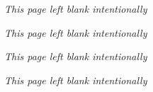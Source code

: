 \documentclass[10pt,twoside]{book}
\begin{document}
\frontmatter

\lhead[\small\thepage]{}
\rhead[]{\small\thepage}
\chead[]{}
\cfoot[]{}


\newpage
 

\newpage
 

\newpage
 

\newpage
 

\newpage
 

\newpage
 

\newpage
 

\newpage
\centerline{\small\textsl{This page left blank intentionally}}
\thispagestyle{empty}
\newpage 
\centerline{\small\textsl{This page left blank intentionally}}
\thispagestyle{empty}
\newpage 
\mainmatter

\lhead[\small\thepage\quad ]{}
\chead[]{}
\cfoot[]{}




\resumechapters
\lhead[\small\thepage\quad ]{}
\chead[]{}
\cfoot[]{}




\newpage
\centerline{\small\textsl{This page left blank intentionally}}
\thispagestyle{empty}
\newpage 
\centerline{\small\textsl{This page left blank intentionally}}
\thispagestyle{empty}
\newpage 

\newpage
\makeatletter
\renewcommand{\@idxitem}{\par\hangindent 20\p@}
\renewcommand*\subitem{\@idxitem \hspace*{10\p@}}
\renewcommand*\subsubitem{\@idxitem \hspace*{15\p@}}
\makeatother
 
\label{index}
\printindex
\end{document}
